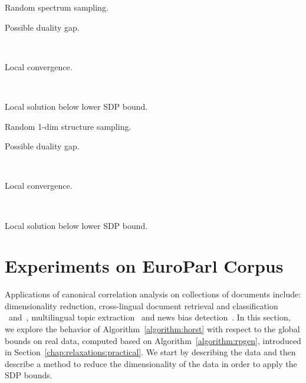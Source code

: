 \begin{table}[t]
  \caption{Random spectrum sampling.}
    \begin{subtable}[t]{.5\textwidth}
        \centering
        \caption{Possible duality gap.}
        
        \label{tb:rs_dg}
    \end{subtable}
    ~
    \begin{subtable}[t]{.5\textwidth}
        \centering
        \caption{Local convergence.}
        
        \label{tb:rs_lc}
    \end{subtable}
    ~
    \begin{subtable}[t]{\textwidth}
        \centering
        \caption{Local solution below lower SDP bound.}
        
        \label{tb:rs_lb}
    \end{subtable}
  \label{tb:rs}
\end{table}

\begin{table}[t]
  \caption{Random 1-dim structure sampling.}
    \begin{subtable}[t]{.5\textwidth}
        \centering
        \caption{Possible duality gap.}
        
        \label{tb:r1d_dg}
    \end{subtable}
    ~
    \begin{subtable}[t]{.5\textwidth}
        \centering
        \caption{Local convergence.}
        
        \label{tb:r1d_lc}
    \end{subtable}
    ~
    \begin{subtable}[t]{\textwidth}
        \centering
        \caption{Local solution below lower SDP bound.}
        
        \label{tb:r1d_lb}
    \end{subtable}
  \label{tb:r1d}
\end{table}

\section{Experiments on EuroParl Corpus}\label{subsec:documents}

Applications of canonical correlation analysis on collections of
documents include: dimensionality reduction, cross-lingual document retrieval and classification~
\cite{mrpqr}~and~\cite{ccatextdva}, multilingual topic extraction~\cite{mcca} and news bias detection~\cite{ccanewsbias}.
In this section, we explore the behavior of
Algorithm~\ref{algorithm:horst} with respect to the global
bounds on real data, computed based on Algorithm~\ref{algorithm:rpgen},
introduced in Section~\ref{chap:relaxations:practical}.
We start by describing the data and then describe a method to
reduce the dimensionality of the data in order to apply the SDP
bounds.

